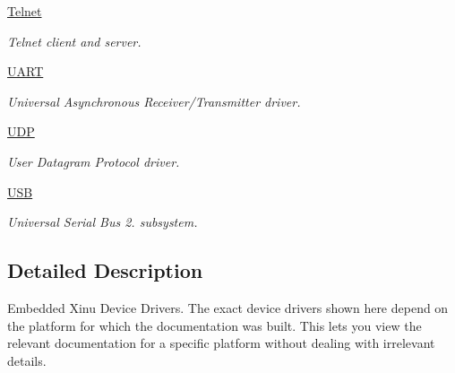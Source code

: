 \begin{DoxyCompactItemize}
\hyperlink{group__telnet}{Telnet}
\begin{DoxyCompactList}\small\item\em Telnet client and server. \end{DoxyCompactList}\item 
\hyperlink{group__uartdriver}{U\-A\-R\-T}
\begin{DoxyCompactList}\small\item\em Universal Asynchronous Receiver/\-Transmitter driver. \end{DoxyCompactList}\item 
\hyperlink{group__udp}{U\-D\-P}
\begin{DoxyCompactList}\small\item\em User Datagram Protocol driver. \end{DoxyCompactList}\item 
\hyperlink{group__usb}{U\-S\-B}
\begin{DoxyCompactList}\small\item\em Universal Serial Bus 2. subsystem. \end{DoxyCompactList}\end{DoxyCompactItemize}


\subsection{Detailed Description}
Embedded Xinu Device Drivers. The exact device drivers shown here depend on the platform for which the documentation was built. This lets you view the relevant documentation for a specific platform without dealing with irrelevant details. 
